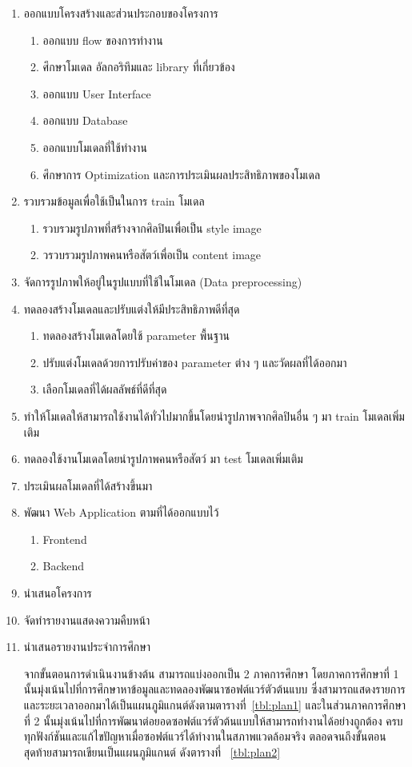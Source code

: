 \documentclass[12pt,oneside,openright,a4paper]{cpe-thai-project}
\begin{document}
\begin{enumerate}
  \item ออกแบบโครงสร้างและส่วนประกอบของโครงการ
  \begin{enumerate}
    \item ออกแบบ flow ของการทำงาน
    \item ศึกษาโมเดล อัลกอริทึมและ library ที่เกี่ยวข้อง
    \item ออกแบบ User Interface
    \item ออกแบบ Database
    \item ออกแบบโมเดลที่ใช้ทำงาน
    \item ศึกษาการ Optimization และการประเมินผลประสิทธิภาพของโมเดล
  \end{enumerate}
  \item รวบรวมข้อมูลเพื่อใช้เป็นในการ train โมเดล
  \begin{enumerate}
    \item รวบรวมรูปภาพที่สร้างจากศิลปินเพื่อเป็น style image
    \item วรวบรวมรูปภาพคนหรือสัตว์เพื่อเป็น content image
  \end{enumerate}
  \item จัดการรูปภาพให้อยู่ในรูปแบบที่ใช้ในโมเดล (Data preprocessing)
  \item ทดลองสร้างโมเดลและปรับแต่งให้มีประสิทธิภาพดีที่สุด
  \begin{enumerate}
    \item ทดลองสร้างโมเดลโดยใช้ parameter พื้นฐาน
    \item ปรับแต่งโมเดลด้วยการปรับค่าของ parameter ต่าง ๆ และวัดผลที่ได้ออกมา
    \item เลือกโมเดลที่ได้ผลลัพธ์ที่ดีที่สุด
  \end{enumerate}
  \item ทำให้โมเดลให้สามารถใช้งานได้ทั่วไปมากขึ้นโดยนำรูปภาพจากศิลปินอื่น ๆ มา train โมเดลเพิ่มเติม
  \item ทดลองใช้งานโมเดลโดยนำรูปภาพคนหรือสัตว์ มา test โมเดลเพิ่มเติม
  \item ประเมินผลโมเดลที่ได้สร้างขึ้นมา
  \item พัฒนา Web Application ตามที่ได้ออกแบบไว้
  \begin{enumerate}
    \item Frontend
    \item Backend
  \end{enumerate}
  \item นำเสนอโครงการ
  \item จัดทำรายงานแสดงความคืบหน้า
  \item นำเสนอรายงานประจำการศึกษา 
  \par\setlength{\parindent}{5ex}
  จากขั้นตอนการดำเนินงานข้างต้น สามารถแบ่งออกเป็น 2 ภาคการศึกษา โดยภาคการศึกษาที่ 1 นั้นมุ่งเน้นไปที่การศึกษาหาข้อมูลและทดลองพัฒนาซอฟต์แวร์ตัวต้นแบบ ซึ่งสามารถแสดงรายการและระยะเวลาออกมาได้เป็นแผนภูมิแกนต์ดังตามตารางที่~\ref{tbl:plan1} และในส่วนภาคการศึกษาที่ 2 นั้นมุ่งเน้นไปที่การพัฒนาต่อยอดซอฟต์แวร์ตัวต้นแบบให้สามารถทำงานได้อย่างถูกต้อง ครบทุกฟังก์ชันและแก้ไขปัญหาเมื่อซอฟต์แวร์ได้ทำงานในสภาพแวดล้อมจริง ตลอดจนถึงขั้นตอนสุดท้ายสามารถเขียนเป็นแผนภูมิแกนต์
  ดังตารางที่ ~\ref{tbl:plan2}
\end{enumerate}
\end{document}
